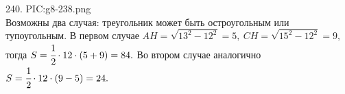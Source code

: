 240. {{PIC:g8-238.png}}\\
Возможны два случая: треугольник может быть остроугольным или тупоугольным. В первом случае $AH=\sqrt{13^2-12^2}=5,\ CH=\sqrt{15^2-12^2}=9,$ тогда $S=\cfrac{1}{2}\cdot12\cdot(5+9)=84.$ Во втором случае аналогично $S=\cfrac{1}{2}\cdot12\cdot(9-5)=24.$\newpage\noindent
